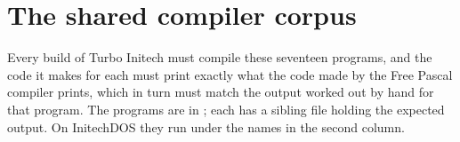 \chapter{The shared compiler corpus}

Every build of Turbo Initech must compile these seventeen programs, and the
code it makes for each must print exactly what the code made by the Free
Pascal compiler prints, which in turn must match the output worked out by
hand for that program.  The programs are in ; each
has a sibling file  holding the expected output.  On
InitechDOS they run under the names in the second column.

